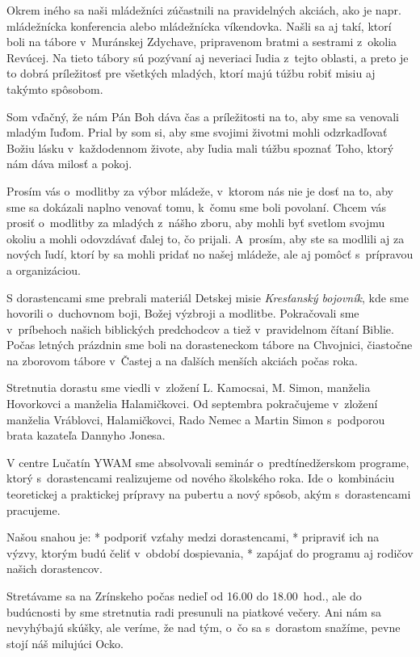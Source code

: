 Okrem iného sa naši mládežníci zúčastnili na pravidelných akciách, ako je napr. mládežnícka konferencia alebo mládežnícka víkendovka. Našli sa aj takí, ktorí boli na tábore v~Muránskej Zdychave, pripravenom bratmi a sestrami z~okolia Revúcej. Na tieto tábory sú pozývaní aj neveriaci ľudia z~tejto oblasti, a preto je to dobrá príležitosť pre všetkých mladých, ktorí majú túžbu robiť misiu aj takýmto spôsobom.

Som vďačný, že nám Pán Boh dáva čas a príležitosti na to, aby sme sa venovali mladým ľuďom. Prial by som si, aby sme svojimi životmi mohli odzrkadľovať Božiu lásku v~každodennom živote, aby ľudia mali túžbu spoznať Toho, ktorý nám dáva milosť a pokoj.

Prosím vás o~modlitby za výbor mládeže, v~ktorom nás nie je dosť na to, aby sme sa dokázali naplno venovať tomu, k~čomu sme boli povolaní. Chcem vás prosiť o~modlitby za mladých z~nášho zboru, aby mohli byť svetlom svojmu okoliu a mohli odovzdávať ďalej to, čo prijali.  A~prosím, aby ste sa modlili aj za nových ľudí, ktorí by sa mohli pridať no našej mládeže, ale aj pomôcť s~prípravou a organizáciou.



S dorastencami sme prebrali materiál Detskej misie {\it Kresťanský bojovník}, kde sme hovorili o~duchovnom boji, Božej výzbroji a modlitbe. Pokračovali sme v~príbehoch našich biblických predchodcov a tiež v~pravidelnom čítaní Biblie. Počas letných prázdnin sme boli na dorasteneckom tábore na Chvojnici, čiastočne na zborovom tábore v~Častej a na ďalších menších akciách počas roka.

Stretnutia dorastu sme viedli v~zložení L. Kamocsai, M. Simon, manželia Hovorkovci a manželia Halamičkovci. Od septembra pokračujeme v~zložení manželia Vráblovci, Halamičkovci, Rado Nemec a Martin Simon s~podporou brata kazateľa Dannyho Jonesa.

V centre Lučatín YWAM sme absolvovali seminár o~predtínedžerskom programe, ktorý s~dorastencami realizujeme od nového školského roka. Ide o~kombináciu teoretickej a praktickej prípravy na pubertu a nový spôsob, akým s~dorastencami pracujeme.

Našou snahou je:
\begitems
* podporiť vzťahy medzi dorastencami,
* pripraviť ich na výzvy, ktorým budú čeliť v~období dospievania,
* zapájať do programu aj rodičov našich dorastencov.
\enditems

Stretávame sa na Zrínskeho počas nedieľ od 16.00 do 18.00~hod., ale do budúcnosti by sme stretnutia radi presunuli na piatkové večery. Ani nám sa nevyhýbajú skúšky, ale veríme, že nad tým, o~čo sa s~dorastom snažíme, pevne stojí náš milujúci Ocko.

